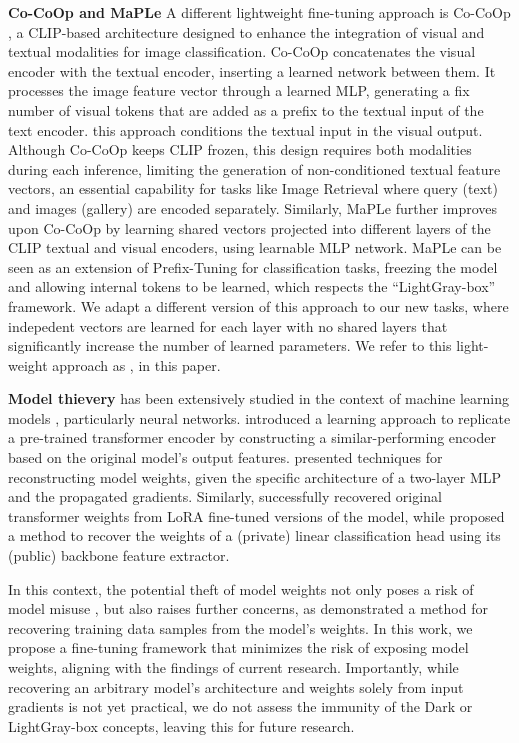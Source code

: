 {\bf Co-CoOp and MaPLe} A different lightweight fine-tuning approach is Co-CoOp \citep{Co-CoOp}, a CLIP-based architecture designed to enhance the integration of visual and textual modalities for image classification. Co-CoOp concatenates the visual encoder with the textual encoder, inserting a learned network between them. It processes the image feature vector through a learned MLP, generating a fix number of visual tokens that are added as a prefix to the textual input of the text encoder. \ie this approach conditions the textual input in the visual output. Although Co-CoOp keeps CLIP frozen, this design requires both modalities during each inference, limiting the generation of non-conditioned textual feature vectors, an essential capability for tasks like Image Retrieval where query (text) and images (gallery) are encoded separately. Similarly, MaPLe \citep{maple} further improves upon Co-CoOp by learning shared vectors projected into different layers of the CLIP textual and visual encoders, using learnable MLP network. MaPLe can be seen as an extension of Prefix-Tuning \citep{prefix_tunning} for classification tasks, freezing the model and allowing internal tokens to be learned, which respects the ``LightGray-box'' framework. We adapt a different version of this approach to our new tasks, where indepedent vectors are learned for each layer with no shared layers that significantly increase the number of learned parameters. We  refer to this light-weight approach as \oursp, in this paper.


{\bf Model thievery} has been extensively studied in the context of machine learning models \citep{stealing_ml_models,stealing_bert}, particularly neural networks. \cite{cont_steal} introduced a learning approach to replicate a pre-trained transformer encoder by constructing a similar-performing encoder based on the original model's output features. \cite{model_reconstruction} presented techniques for reconstructing model weights, given the specific architecture of a two-layer MLP and the propagated gradients. Similarly, \cite{horwitz2024recovering} successfully recovered original transformer weights from LoRA fine-tuned versions of the model, while \cite{greybox_mlp_attack} proposed a method to recover the weights of a (private) linear classification head using its (public) backbone feature extractor. 

In this context, the potential theft of model weights not only poses a risk of model misuse \citep{foundation_model_risks}, but also raises further concerns, as \cite{Reconstructing_Training_Data} demonstrated a method for recovering training data samples from the model's weights. In this work, we propose a fine-tuning framework that minimizes the risk of exposing model weights, aligning with the findings of current research. 
Importantly, while recovering an arbitrary model's architecture and weights solely from input gradients is not yet practical, we do not assess the immunity of the Dark or LightGray-box concepts, leaving this for future research.

